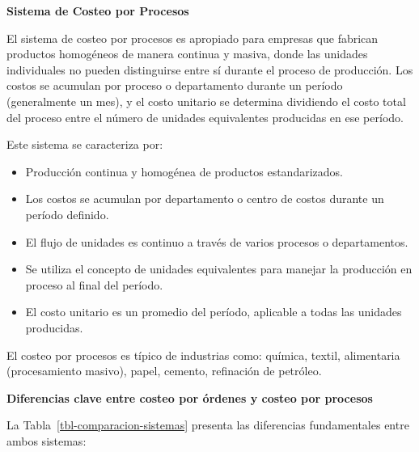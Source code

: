 \documentclass[
  stu,
  floatsintext,
  longtable,
  a4paper,
  nolmodern,
  notxfonts,
  notimes,
  12pt,
  colorlinks=true,linkcolor=blue,citecolor=blue,urlcolor=blue]{apa7}
\providecommand{\tightlist}{%
  \setlength{\itemsep}{0pt}\setlength{\parskip}{0pt}}
\begin{document}
\textbf{Sistema de Costeo por Procesos}

El sistema de costeo por procesos es apropiado para empresas que
fabrican productos homogéneos de manera continua y masiva, donde las
unidades individuales no pueden distinguirse entre sí durante el proceso
de producción. Los costos se acumulan por proceso o departamento durante
un período (generalmente un mes), y el costo unitario se determina
dividiendo el costo total del proceso entre el número de unidades
equivalentes producidas en ese período.

Este sistema se caracteriza por:

\begin{itemize}
\tightlist
\item
  Producción continua y homogénea de productos estandarizados.
\item
  Los costos se acumulan por departamento o centro de costos durante un
  período definido.
\item
  El flujo de unidades es continuo a través de varios procesos o
  departamentos.
\item
  Se utiliza el concepto de unidades equivalentes para manejar la
  producción en proceso al final del período.
\item
  El costo unitario es un promedio del período, aplicable a todas las
  unidades producidas.
\end{itemize}

El costeo por procesos es típico de industrias como: química, textil,
alimentaria (procesamiento masivo), papel, cemento, refinación de
petróleo.

\textbf{Diferencias clave entre costeo por órdenes y costeo por
procesos}

La Tabla~\ref{tbl-comparacion-sistemas} presenta las diferencias
fundamentales entre ambos sistemas:
\end{document}
